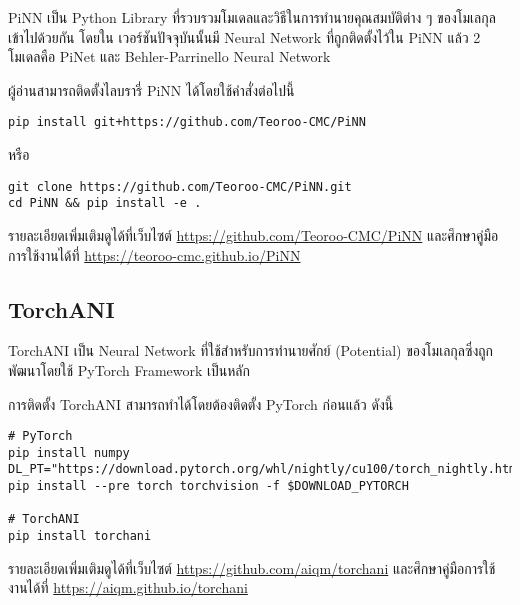 PiNN\autocite{shao2020} เป็น Python Library ที่รวบรวมโมเดลและวิธีในการทำนายคุณสมบัติต่าง ๆ ของโมเลกุลเข้าไปด้วยกัน โดยใน%
เวอร์ชันปัจจุบันนั้นมี Neural Network ที่ถูกติดตั้งไว้ใน PiNN แล้ว 2 โมเดลคือ PiNet และ Behler-Parrinello Neural Network

ผู้อ่านสามารถติดตั้งไลบรารี่ PiNN ได้โดยใช้คำสั่งต่อไปนี้

\begin{lstlisting}[style=MyBash]
pip install git+https://github.com/Teoroo-CMC/PiNN
\end{lstlisting}

\noindent หรือ

\begin{lstlisting}[style=MyBash]
git clone https://github.com/Teoroo-CMC/PiNN.git 
cd PiNN && pip install -e .
\end{lstlisting}

รายละเอียดเพิ่มเติมดูได้ที่เว็บไซต์ \url{https://github.com/Teoroo-CMC/PiNN} และศึกษาคู่มือการใช้งานได้ที่ 
\url{https://teoroo-cmc.github.io/PiNN}

\subsection{TorchANI}
\label{ssec:lib_torchani}

TorchANI\autocite{gao2020} เป็น Neural Network ที่ใช้สำหรับการทำนายศักย์ (Potential) ของโมเลกุลซึ่งถูกพัฒนาโดยใช้ PyTorch 
Framework เป็นหลัก 

การติดตั้ง TorchANI สามารถทำได้โดยต้องติดตั้ง PyTorch ก่อนแล้ว ดังนี้

\begin{lstlisting}[style=MyBash]
# PyTorch
pip install numpy
DL_PT="https://download.pytorch.org/whl/nightly/cu100/torch_nightly.html"
pip install --pre torch torchvision -f $DOWNLOAD_PYTORCH

# TorchANI
pip install torchani
\end{lstlisting}

รายละเอียดเพิ่มเติมดูได้ที่เว็บไซต์ \url{https://github.com/aiqm/torchani} และศึกษาคู่มือการใช้งานได้ที่ 
\url{https://aiqm.github.io/torchani}
